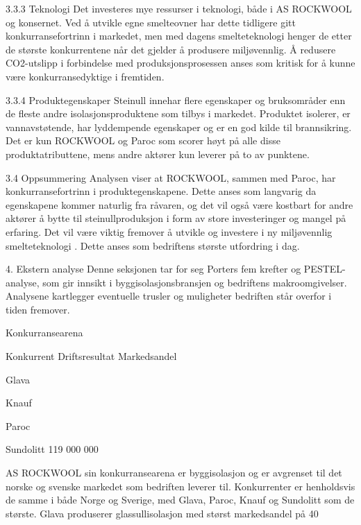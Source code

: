 3.3.3 Teknologi
Det investeres mye ressurser i teknologi, både i AS ROCKWOOL og konsernet. Ved å utvikle egne smelteovner har dette tidligere gitt konkurransefortrinn i markedet, men med dagens smelteteknologi henger de etter de største konkurrentene når det gjelder å produsere miljøvennlig. Å redusere CO2-utslipp i forbindelse med produksjonsprosessen anses som kritisk for å kunne være konkurransedyktige i fremtiden.

3.3.4 Produktegenskaper
Steinull innehar flere egenskaper og bruksområder enn de fleste andre isolasjonsproduktene som tilbys i markedet. Produktet isolerer, er vannavstøtende, har lyddempende egenskaper og er en god kilde til brannsikring. Det er kun ROCKWOOL og Paroc som scorer høyt på alle disse produktatributtene, mens andre aktører kun leverer på to av punktene.  

3.4 Oppsummering 
Analysen viser at ROCKWOOL, sammen med Paroc, har konkurransefortrinn i produktegenskapene. Dette anses som langvarig da egenskapene kommer naturlig fra råvaren, og det vil også være kostbart for andre aktører å bytte til steinullproduksjon i form av store investeringer og mangel på erfaring. Det vil være viktig fremover å utvikle og investere i ny miljøvennlig smelteteknologi . Dette anses som bedriftens største utfordring i dag.

4. Ekstern analyse
Denne seksjonen tar for seg Porters fem krefter og PESTEL- analyse, som gir innsikt i byggisolasjonsbransjen og bedriftens makroomgivelser. Analysene kartlegger eventuelle trusler og muligheter bedriften står overfor i tiden fremover.

Konkurransearena


Konkurrent
Driftsresultat 
Markedsandel




Glava








Knauf








Paroc








Sundolitt
119 000 000







AS ROCKWOOL sin konkurransearena er byggisolasjon og er avgrenset til det norske og svenske markedet som bedriften leverer til.  Konkurrenter er henholdsvis de samme i både Norge og Sverige, med Glava, Paroc, Knauf og Sundolitt som de største. Glava produserer glassullisolasjon med størst markedsandel på 40%



